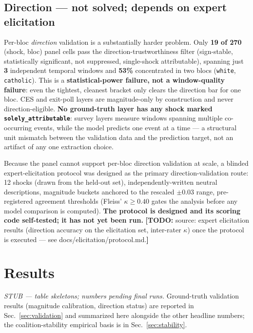 \documentclass[11pt]{article}
\newcommand{\todo}[1]{{\color{red}\textbf{[TODO:} #1\textbf{]}}}
\newcommand{\stub}[1]{{\color{RoyalBlue}\emph{#1}}}
\begin{document}
\subsection{Direction --- not solved; depends on expert elicitation}
Per-bloc \emph{direction} validation is a substantially harder problem.
Only \textbf{19 of 270} (shock, bloc) panel cells pass the
direction-trustworthiness filter (sign-stable, statistically significant,
not suppressed, single-shock attributable), spanning just \textbf{3}
independent temporal windows and \textbf{53\%} concentrated in two blocs
(\texttt{white}, \texttt{catholic}). This is a \textbf{statistical-power
failure, not a window-quality failure}: even the tightest, cleanest
bracket only clears the direction bar for one bloc. CES and exit-poll
layers are magnitude-only by construction and never direction-eligible.
\textbf{No ground-truth layer has any shock marked
\texttt{solely\_attributable}}: survey layers measure windows spanning
multiple co-occurring events, while the model predicts one event at a
time --- a structural unit mismatch between the validation data and the
prediction target, not an artifact of any one extraction choice.

Because the panel cannot support per-bloc direction validation at scale, a
blinded expert-elicitation protocol was designed as the primary
direction-validation route: 12 shocks (drawn from the held-out set),
independently-written neutral descriptions, magnitude buckets anchored to
the rescaled $\pm0.03$ range, pre-registered agreement thresholds (Fleiss'
$\kappa\ge0.40$ gates the analysis before any model comparison is
computed). \textbf{The protocol is designed and its scoring code
self-tested; it has not yet been run.}
\todo{source: expert elicitation results (direction accuracy on the
elicitation set, inter-rater $\kappa$) once the protocol is executed ---
see docs/elicitation/protocol.md.}

\section{Results}
\stub{STUB --- table skeletons; numbers pending final runs.}
Ground-truth validation results (magnitude calibration, direction status) are
reported in Sec.~\ref{sec:validation} and summarized here alongside the other
headline numbers; the coalition-stability empirical basis is in
Sec.~\ref{sec:stability}.
\end{document}

